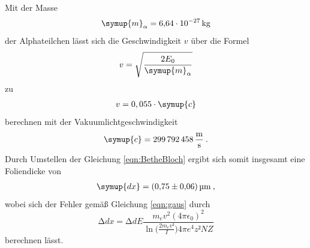 Mit der Masse
\begin{align*}
  \symup{m}_{\alpha}=\SI{6.64e-27}{\kilo\gram}
\end{align*}
der Alphateilchen \cite{online2}
lässt sich die Geschwindigkeit $v$ über die Formel
\begin{equation}
  v =\sqrt{\frac{2 E_0}{\symup{m}_{\alpha}}}
\end{equation}
zu
\begin{align*}
  v =0,055 \cdot \symup{c}
\end{align*}
berechnen mit der Vakuumlichtgeschwindigkeit \cite{online4}
\begin{align*}
  \symup{c}=\SI{299792458}{\metre\per\second} \:.
\end{align*}
Durch Umstellen der Gleichung \eqref{eqn:BetheBloch}
ergibt sich somit insgesamt eine Foliendicke von
\begin{align*}
  \symup{dx}=\SI{0.75(6)}{\micro\metre} \: ,
\end{align*}
wobei sich der Fehler gemäß Gleichung \eqref{eqn:gaus} durch
\begin{equation}
  \increment dx=\increment dE \frac{m_e v^2 (4\pi \epsilon_0)^2}{\ln\Bigg(\frac{2m_e v²}{I}\Bigg)4\pi e^4 z²NZ}
\end{equation}
berechnen lässt.






